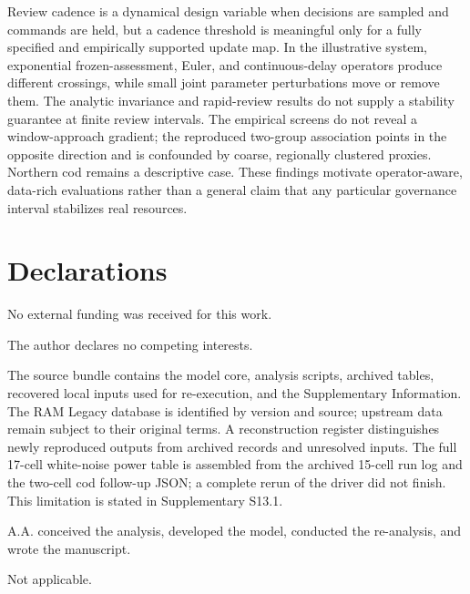 Review cadence is a dynamical design variable when decisions are sampled and commands are held, but a cadence threshold is meaningful only for a fully specified and empirically supported update map. In the illustrative system, exponential frozen-assessment, Euler, and continuous-delay operators produce different crossings, while small joint parameter perturbations move or remove them. The analytic invariance and rapid-review results do not supply a stability guarantee at finite review intervals. The empirical screens do not reveal a window-approach gradient; the reproduced two-group association points in the opposite direction and is confounded by coarse, regionally clustered proxies. Northern cod remains a descriptive case. These findings motivate operator-aware, data-rich evaluations rather than a general claim that any particular governance interval stabilizes real resources.



\section*{Declarations}
\begin{description}[leftmargin=2.0cm,style=nextline]
\item[Funding] No external funding was received for this work.
\item[Conflicts of interest] The author declares no competing interests.
\item[Data and code availability] The source bundle contains the model core, analysis scripts, archived tables, recovered local inputs used for re-execution, and the Supplementary Information. The RAM Legacy database is identified by version and source; upstream data remain subject to their original terms. A reconstruction register distinguishes newly reproduced outputs from archived records and unresolved inputs. The full 17-cell white-noise power table is assembled from the archived 15-cell run log and the two-cell cod follow-up JSON; a complete rerun of the driver did not finish. This limitation is stated in Supplementary S13.1.
\item[Author contributions] A.A. conceived the analysis, developed the model, conducted the re-analysis, and wrote the manuscript.
\item[Ethics approval] Not applicable.
\end{description}

